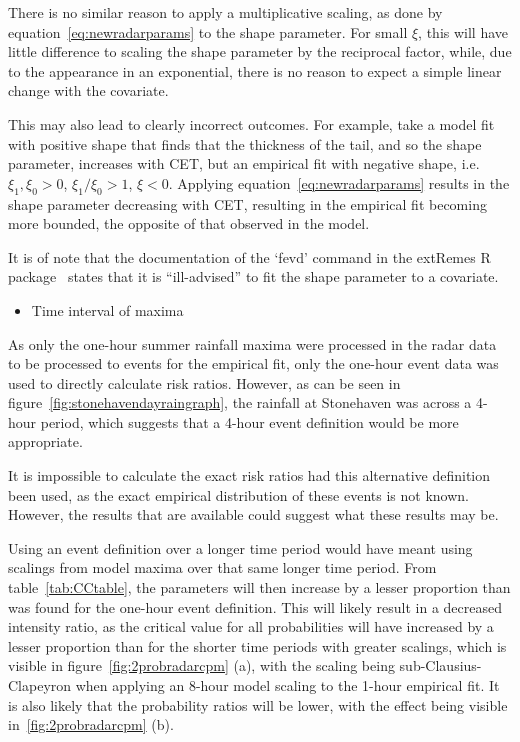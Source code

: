 There is no similar reason to apply a multiplicative scaling,
    as done by equation~\ref{eq:newradarparams} to the shape parameter.
For small $\xi$, this will have little difference to scaling the shape parameter by the reciprocal factor,
    while, due to the appearance in an exponential,
    there is no reason to expect a simple linear change with the covariate.

This may also lead to clearly incorrect outcomes.
For example, take a model fit with positive shape that finds that the thickness of the tail,
    and so the shape parameter,
    increases with CET,
    but an empirical fit with negative shape, i.e. $\xi_1, \xi_0 > 0$, $\xi_1 / \xi_0 > 1$, $\xi < 0$.
Applying equation~\ref{eq:newradarparams} results in the shape parameter decreasing with CET,
    resulting in the empirical fit becoming more bounded,
    the opposite of that observed in the model.

It is of note that the documentation of the `fevd' command in the extRemes R package~\cite{extremes_R} states
    that it is ``ill-advised'' to fit the shape parameter to a covariate.

\begin{itemize}\item Time interval of maxima\end{itemize}

As only the one-hour summer rainfall maxima were processed in the radar data to be processed to events for the empirical fit,
    only the one-hour event data was used to directly calculate risk ratios.
However,
    as can be seen in figure~\ref{fig:stonehavendayraingraph},
    the rainfall at Stonehaven was across a 4-hour period,
    which suggests that a 4-hour event definition would be more appropriate.

It is impossible to calculate the exact risk ratios had this alternative definition been used,
    as the exact empirical distribution of these events is not known.
However, the results that are available could suggest what these results may be.

Using an event definition over a longer time period would have meant using scalings from model maxima over that same longer time period.
From table~\ref{tab:CCtable},
    the parameters will then increase by a lesser proportion than was found for the one-hour event definition.
This will likely result in a decreased intensity ratio,
    as the critical value for all probabilities will have increased by a lesser proportion than for the shorter time periods with greater scalings,
    which is visible in figure~\ref{fig:2probradarcpm} (a),
    with the scaling being sub-Clausius-Clapeyron when applying an 8-hour model scaling to the 1-hour empirical fit.
It is also likely that the probability ratios will be lower,
    with the effect being visible in~\ref{fig:2probradarcpm} (b).

